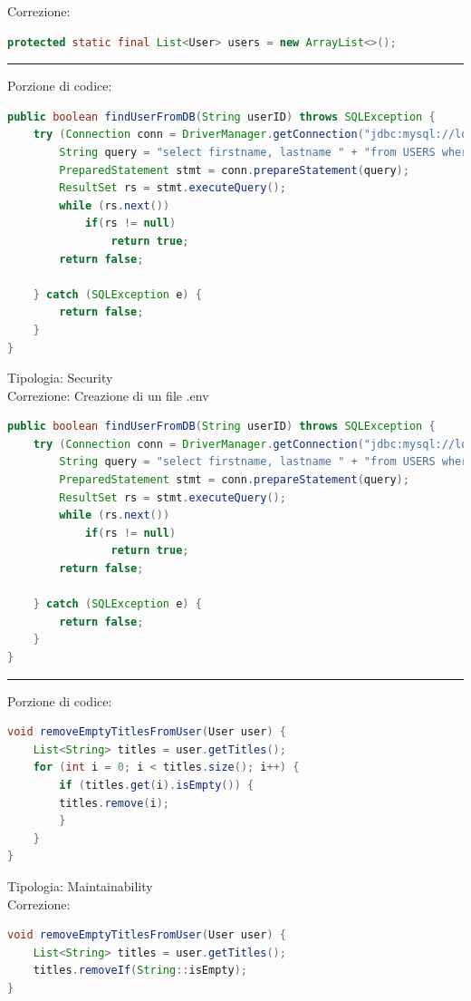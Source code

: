 \documentclass{article}
\begin{document}
Correzione:
\begin{lstlisting}[language=Java]
    protected static final List<User> users = new ArrayList<>();
\end{lstlisting}
\vspace{.5em}\hrule\vspace{.5em}
Porzione di codice:
\begin{lstlisting}[language=Java]
public boolean findUserFromDB(String userID) throws SQLException {
    try (Connection conn = DriverManager.getConnection("jdbc:mysql://localhost:3306/mydatabase", BASICUSERID+userID, "password");) {
        String query = "select firstname, lastname " + "from USERS where username="+ (BASICUSERID+userID);
        PreparedStatement stmt = conn.prepareStatement(query);
        ResultSet rs = stmt.executeQuery();
        while (rs.next())
            if(rs != null)
                return true;
        return false;

    } catch (SQLException e) {
        return false;
    }
}
\end{lstlisting}
Tipologia: Security\\
Correzione: Creazione di un file .env
\begin{lstlisting}[language=Java]
public boolean findUserFromDB(String userID) throws SQLException {
    try (Connection conn = DriverManager.getConnection("jdbc:mysql://localhost:3306/mydatabase", BASICUSERID+userID, System.getenv("DB_PASSWORD"));) {
        String query = "select firstname, lastname " + "from USERS where username="+ (BASICUSERID+userID);
        PreparedStatement stmt = conn.prepareStatement(query);
        ResultSet rs = stmt.executeQuery();
        while (rs.next())
            if(rs != null)
                return true;
        return false;

    } catch (SQLException e) {
        return false;
    }
}    
\end{lstlisting}
\vspace{.5em}\hrule\vspace{.5em}
Porzione di codice:
\begin{lstlisting}[language=Java]
void removeEmptyTitlesFromUser(User user) {      
    List<String> titles = user.getTitles();
    for (int i = 0; i < titles.size(); i++) {
        if (titles.get(i).isEmpty()) {
        titles.remove(i); 
        }
    }
}
\end{lstlisting}
Tipologia: Maintainability\\
Correzione:
\begin{lstlisting}[language=Java]
void removeEmptyTitlesFromUser(User user) {      
    List<String> titles = user.getTitles();
    titles.removeIf(String::isEmpty);
}
\end{lstlisting}
\end{document}
